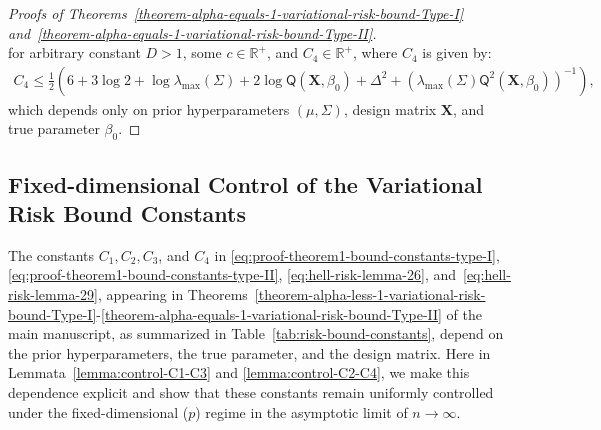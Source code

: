 \documentclass[12pt]{article}
\numberwithin{equation}{section}
\begin{document}
\begin{proof}[Proofs of Theorems~\ref{theorem-alpha-equals-1-variational-risk-bound-Type-I} and~\ref{theorem-alpha-equals-1-variational-risk-bound-Type-II}]
\begin{equation}
\end{equation}
for arbitrary constant $D>1$, some $c\in \mathbb{R}^{+}$, and $C_4\in \mathbb{R}^{+}$, where $C_4$ is given by:
\begin{align}\label{eq:hell-risk-lemma-29}
C_4 \leq \frac{1}{2}\left(6 + 3\log 2 + \log \lambda_{\max}(\Sigma) + 2\log \mathsf{Q}( \mathbf{X}, \beta_0) + \Delta^2 + \left(\lambda_{\max}(\Sigma)\mathsf{Q}^2(\mathbf{X}, \beta_0)\right)^{-1}\right),
\end{align}
which depends only on prior hyperparameters $(\mu, \Sigma)$, design matrix $\mathbf{X}$, and true parameter $\beta_0$.

\end{proof}

\subsection{Fixed-dimensional Control of the Variational Risk Bound Constants}
\label{subsec:fixed-p-constant-control}

The constants $C_1,C_2,C_3$, and $C_4$ in \eqref{eq:proof-theorem1-bound-constants-type-I}, \eqref{eq:proof-theorem1-bound-constants-type-II}, \eqref{eq:hell-risk-lemma-26}, and~\eqref{eq:hell-risk-lemma-29}, appearing in Theorems~\ref{theorem-alpha-less-1-variational-risk-bound-Type-I}-\ref{theorem-alpha-equals-1-variational-risk-bound-Type-II} of the main manuscript, as summarized in Table~\ref{tab:risk-bound-constants}, depend on the prior hyperparameters, the true parameter, and the design matrix. Here in Lemmata~\ref{lemma:control-C1-C3} and \ref{lemma:control-C2-C4}, we make this dependence explicit and show that these constants remain uniformly controlled under the fixed-dimensional ($p$) regime in the asymptotic limit of $n\to \infty$.
\end{document}
